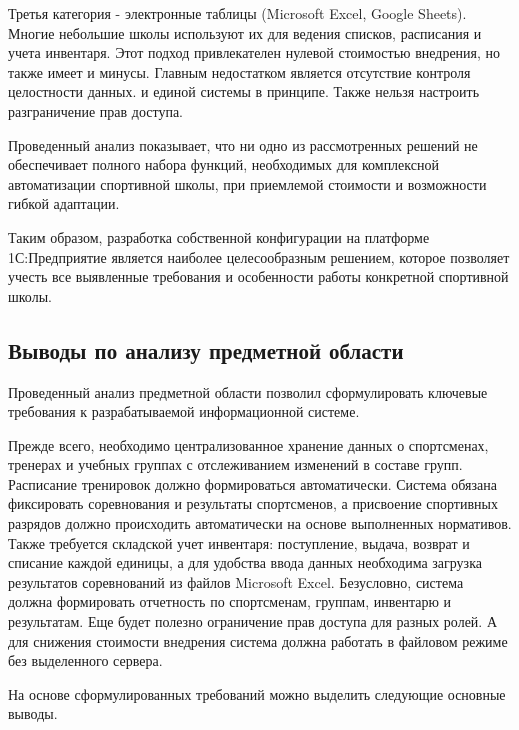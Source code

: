 Третья категория - электронные таблицы (Microsoft Excel, Google Sheets). Многие небольшие школы используют их для ведения списков, расписания и учета инвентаря. Этот подход привлекателен нулевой стоимостью внедрения, но также имеет и минусы. Главным недостатком является отсутствие контроля целостности данных. и единой системы в принципе. Также нельзя настроить разграничение прав доступа.

Проведенный анализ показывает, что ни одно из рассмотренных решений не обеспечивает полного набора функций, необходимых для комплексной автоматизации спортивной школы, при приемлемой стоимости и возможности гибкой адаптации. 

Таким образом, разработка собственной конфигурации на платформе 1С:Предприятие является наиболее целесообразным решением, которое позволяет учесть все выявленные требования и особенности работы конкретной спортивной школы.


\subsection{Выводы по анализу предметной области}

Проведенный анализ предметной области позволил сформулировать ключевые требования к разрабатываемой информационной системе.

Прежде всего, необходимо централизованное хранение данных о спортсменах, тренерах и учебных группах с отслеживанием изменений в составе групп. Расписание тренировок должно формироваться автоматически. Система обязана фиксировать соревнования и результаты спортсменов, а присвоение спортивных разрядов должно происходить автоматически на основе выполненных нормативов. Также требуется складской учет инвентаря: поступление, выдача, возврат и списание каждой единицы, а для удобства ввода данных необходима загрузка результатов соревнований из файлов Microsoft Excel. Безусловно, система должна формировать отчетность по спортсменам, группам, инвентарю и результатам. Еще будет полезно ограничение прав доступа для разных ролей. А для снижения стоимости внедрения система должна работать в файловом режиме без выделенного сервера.

На основе сформулированных требований можно выделить следующие основные выводы.

